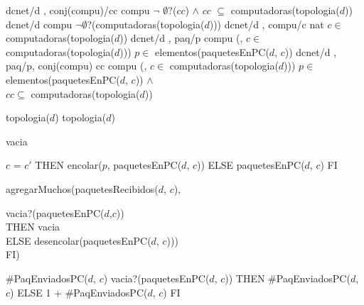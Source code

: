 \begin{tad}{}
	 {dcnet/d , conj(compu)/cc} {compu} {$\neg$ $\emptyset?$($cc$) $\wedge$ 
																	$cc$ $\subseteq$ computadoras(topologia($d$))}	
	 {dcnet/d} {compu} {$\neg\emptyset$?(computadoras(topologia($d$)))}   
	 {dcnet/d , compu/c} {nat}	{$c\in$ computadoras(topologia($d$))}							  
	 {dcnet/d , paq/p} {compu} {(, $c \in$ computadoras(topologia($d$))) $p\in$ elementos(paquetesEnPC($d$, $c$))}
	 {dcnet/d , paq/p, conj(compu) cc} {compu} {(, $c \in$ computadoras(topologia($d$))) $p\in$ elementos(paquetesEnPC($d$, $c$)) $\wedge$ \\ $cc \subseteq$ computadoras(topologia($d$))}


	 {topologia($d$)}
	 {topologia($d$)}

	 {vacia}

			
	 { \IF $c$ = $c'$
																	THEN encolar($p$, paquetesEnPC($d$, $c$))
																	ELSE paquetesEnPC($d$, $c$)
																	FI}	
			  {agregarMuchos(paquetesRecibidos($d$, $c$), 			  
			  
			  \hspace*{6.5em}  \IFL vacia?(paquetesEnPC($d$,$c$))\\
			  \hspace*{6.5em}  THEN vacia \\
			  \hspace*{6.5em}  ELSE desencolar(paquetesEnPC($d$, $c$)))\\
			  \hspace*{6.5em}FI)}
	
	 {\#PaqEnviadosPC($d$, $c$)}
	 { \IF vacia?(paquetesEnPC($d$, $c$))
															 THEN \#PaqEnviadosPC($d$, $c$)
															 ELSE 1 + \#PaqEnviadosPC($d$, $c$)
															 FI}	
  

\end{tad}
